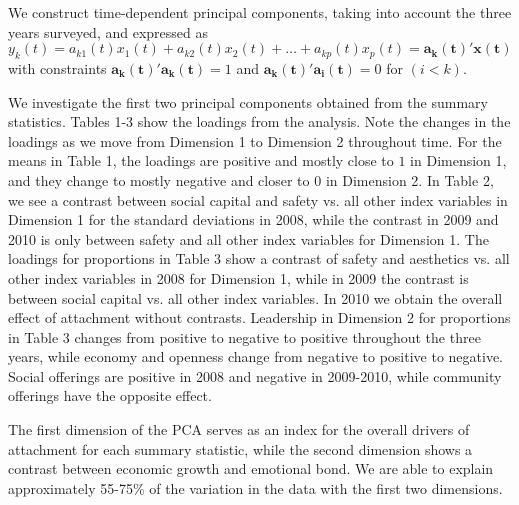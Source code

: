 \documentclass[11pt]{asaproc}
\begin{document}
We construct time-dependent principal components, taking into account
the three years surveyed, and expressed as
\begin{equation}
 y_{k}(t) = a_{k1}(t)x_{1}(t) + a_{k2}(t)x_{2}(t) + \dots + a_{kp}(t)x_{p}(t) =
 \mathbf{a_{k}(t)'x(t)}
\end{equation}
 with constraints
$\mathbf{a_{k}(t)'a_{k}(t)} = 1$ and $\mathbf{a_{k}(t)'a_{i}(t)} = 0$ for $(i<k)$.




We investigate the first two principal components obtained from the
summary statistics. Tables 1-3 show the loadings from the
analysis. Note the changes in the loadings as we move from Dimension 1
to Dimension 2 throughout time. For the means in Table 1, the loadings are
positive and mostly close to $1$ in Dimension 1, and they change to
mostly negative and closer to $0$ in Dimension 2. In Table 2, we see a contrast
between social capital and safety vs. all other index variables in
Dimension 1 for the standard deviations in 2008, while the contrast in
2009 and 2010 is only between safety and all other index variables for
Dimension 1. The loadings for proportions in Table 3 show a contrast of safety
and aesthetics vs. all other index variables in 2008 for Dimension 1,
while in 2009 the contrast is between social capital vs. all other
index variables. In 2010 we obtain the overall effect of attachment
without contrasts. Leadership in Dimension 2 for proportions in Table
3 changes from
positive to negative to positive throughout the three years, while
economy and openness change from negative to positive to negative. Social
offerings are positive in 2008 and negative in 2009-2010, while
community offerings have the opposite effect. 

The first dimension of the PCA serves as an
index for the overall drivers of attachment for each summary
statistic, while the second dimension shows a contrast between
economic growth and emotional bond. We are able to explain
approximately 55-75\% of the variation in the data with the first two
dimensions.
\end{document}
